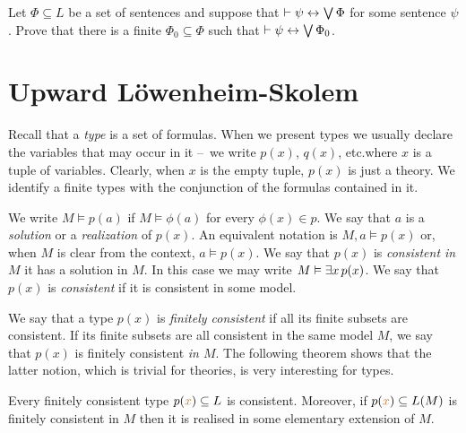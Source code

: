 \documentclass[creche.tex]{subfiles}
\begin{document}
\begin{exercise}
Let $\Phi\subseteq L$ be a set of sentences and suppose that $\vdash\psi\leftrightarrow\bigvee\Phi$ for some sentence $\psi$. Prove that there is a finite $\Phi_0\subseteq\Phi$ such that  $\vdash\psi\leftrightarrow\bigvee\Phi_0$.\QED
\end{exercise}


\section{Upward Löwenheim-Skolem}

\def\ceq#1#2#3{\parbox{13ex}{$\displaystyle #1$}\parbox{4ex}{\hfil$#2$}$\displaystyle #3$}
 
Recall that a \emph{type\/} is a set of formulas. When we present types we usually declare the variables that may occur in it --~we write \emph{$p(x)$}, \emph{$q(x)$}, etc.\@ where $x$ is a tuple of variables. Clearly, when $x$ is the empty tuple, $p(x)$ is just a theory. We identify a finite types with the conjunction of the formulas contained in it.

We write \emph{$M\models p(a)$} if $M\models\phi(a)$ for every $\phi(x)\in p$.  We say that $a$ is a \emph{solution\/} or a \emph{realization\/} of $p(x)$. An equivalent notation is \emph{$M,a\models p(x)$} or, when $M$ is clear from the context, \emph{$a\models p(x)$}. We say that $p(x)$ is \emph{consistent in $M$\/} it has a solution in $M$. In this case we may write \emph{$M\vDash\exists x\,p(x)$}.  We say that $p(x)$ is \emph{consistent\/} if it is consistent in some model.

We say that a type $p(x)$ is \emph{finitely consistent\/} if all its finite subsets are consistent. If its finite subsets are all consistent in the same model $M$, we say that $p(x)$ is finitely consistent \emph{in $M$}. The following theorem shows that the latter notion, which is trivial for theories, is very interesting for types.

\begin{void_thm}\label{thm_compattezzatipi}
Every finitely consistent type $p({\color{brown} x})\subseteq L$ is consistent. Moreover, if $p({\color{brown} x})\subseteq L(M)$ is finitely consistent in $M$ then it is realised in some elementary extension of $M$.
\end{void_thm}
\end{document}
